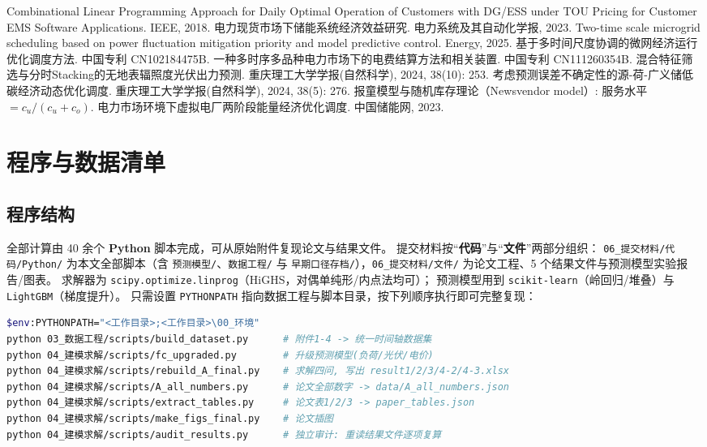 \documentclass[withoutpreface,bwprint]{cumcmthesis}
\begin{document}
\begin{thebibliography}{9}
 Combinational Linear Programming Approach for Daily Optimal Operation of Customers with
DG/ESS under TOU Pricing for Customer EMS Software Applications. IEEE, 2018.
 电力现货市场下储能系统经济效益研究. 电力系统及其自动化学报, 2023.
 Two-time scale microgrid scheduling based on power fluctuation mitigation priority and
model predictive control. Energy, 2025.
 基于多时间尺度协调的微网经济运行优化调度方法. 中国专利 CN102184475B.
 一种多时序多品种电力市场下的电费结算方法和相关装置. 中国专利 CN111260354B.
 混合特征筛选与分时Stacking的无地表辐照度光伏出力预测. 重庆理工大学学报(自然科学), 2024, 38(10): 253.
 考虑预测误差不确定性的源-荷-广义储低碳经济动态优化调度. 重庆理工大学学报(自然科学), 2024, 38(5): 276.
 报童模型与随机库存理论（Newsvendor model）: 服务水平 $=c_u/(c_u+c_o)$.
 电力市场环境下虚拟电厂两阶段能量经济优化调度. 中国储能网, 2023.
\end{thebibliography}


\appendix

\section{程序与数据清单}

\subsection{程序结构}

全部计算由 40 余个 \textbf{Python} 脚本完成，可从原始附件复现论文与结果文件。
提交材料按“\textbf{代码}”与“\textbf{文件}”两部分组织：
\texttt{06\_提交材料/代码/Python/} 为本文全部脚本（含 \texttt{预测模型/}、\texttt{数据工程/}
与 \texttt{早期口径存档/}），\texttt{06\_提交材料/文件/} 为论文工程、5 个结果文件与预测模型实验报告/图表。
求解器为 \texttt{scipy.optimize.linprog}（HiGHS，对偶单纯形/内点法均可）；
预测模型用到 \texttt{scikit-learn}（岭回归/堆叠）与 \texttt{LightGBM}（梯度提升）。
只需设置 \texttt{PYTHONPATH} 指向数据工程与脚本目录，按下列顺序执行即可完整复现：

\begin{lstlisting}[language=bash, caption={一键复现流程（Windows PowerShell）}]
$env:PYTHONPATH="<工作目录>;<工作目录>\00_环境"
python 03_数据工程/scripts/build_dataset.py      # 附件1-4 -> 统一时间轴数据集
python 04_建模求解/scripts/fc_upgraded.py        # 升级预测模型(负荷/光伏/电价)
python 04_建模求解/scripts/rebuild_A_final.py    # 求解四问, 写出 result1/2/3/4-2/4-3.xlsx
python 04_建模求解/scripts/A_all_numbers.py      # 论文全部数字 -> data/A_all_numbers.json
python 04_建模求解/scripts/extract_tables.py     # 论文表1/2/3 -> paper_tables.json
python 04_建模求解/scripts/make_figs_final.py    # 论文插图
python 04_建模求解/scripts/audit_results.py      # 独立审计: 重读结果文件逐项复算
\end{lstlisting}
\end{document}
